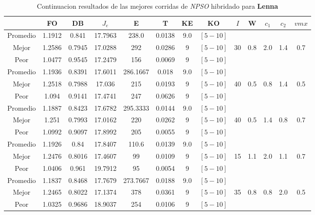 \begin{table}[h!]
    \footnotesize
    \begin{center}
        \begin{tabular}{|c|c|c|c|c|c|c|c|c|c|c|c|c|}
        \hline
            & {\bf FO} & {\bf DB} & $J_e$ & {\bf E} & {\bf T} & {\bf KE} & {\bf KO} & $I$ & W & $c_1$ & $c_2$ & $vmx$ \\
        \hline
        \hline
            Promedio  & 1.1912 & 0.841 & 17.7963 & 238.0 & 0.0138 & 9.0 & $[5-10]$ &  &  &  &  & \\
            \cline{1-8}
            Mejor & 1.2586 & 0.7945  & 17.0288 & 292 & 0.0286 & 9 & $[5-10]$ & 30 & 0.8 & 2.0 & 1.4 & 0.7\\
            \cline{1-8}
            Peor & 1.0477 & 0.9545  & 17.2479 & 156 & 0.0069 & 9 & $[5-10]$ &  &  &  &  & \\
        \hline
        \hline
            Promedio  & 1.1936 & 0.8391 & 17.6011 & 286.1667 & 0.018 & 9.0 & $[5-10]$ &  &  &  &  & \\
            \cline{1-8}
            Mejor & 1.2518 & 0.7988  & 17.036 & 215 & 0.0193 & 9 & $[5-10]$ & 40 & 0.5 & 0.8 & 1.4 & 0.5\\
            \cline{1-8}
            Peor & 1.094 & 0.9141  & 17.4741 & 247 & 0.0626 & 9 & $[5-10]$ &  &  &  &  & \\
        \hline
        \hline
            Promedio  & 1.1887 & 0.8423 & 17.6782 & 295.3333 & 0.0144 & 9.0 & $[5-10]$ &  &  &  &  & \\
            \cline{1-8}
            Mejor & 1.251 & 0.7993  & 17.0162 & 220 & 0.0262 & 9 & $[5-10]$ & 40 & 0.5 & 1.4 & 0.8 & 0.7\\
            \cline{1-8}
            Peor & 1.0992 & 0.9097  & 17.8992 & 205 & 0.0055 & 9 & $[5-10]$ &  &  &  &  & \\
        \hline
        \hline
            Promedio  & 1.1926 & 0.84 & 17.8407 & 110.6 & 0.0139 & 9.0 & $[5-10]$ &  &  &  &  & \\
            \cline{1-8}
            Mejor & 1.2476 & 0.8016  & 17.4607 & 99 & 0.0109 & 9 & $[5-10]$ & 15 & 1.1 & 2.0 & 1.1 & 0.7\\
            \cline{1-8}
            Peor & 1.0406 & 0.961  & 19.7912 & 95 & 0.0054 & 9 & $[5-10]$ &  &  &  &  & \\
        \hline
        \hline
            Promedio  & 1.1837 & 0.8468 & 17.7679 & 273.7667 & 0.0188 & 9.0 & $[5-10]$ &  &  &  &  & \\
            \cline{1-8}
            Mejor & 1.2465 & 0.8022  & 17.1374 & 378 & 0.0361 & 9 & $[5-10]$ & 35 & 0.8 & 0.8 & 2.0 & 0.5\\
            \cline{1-8}
            Peor & 1.0325 & 0.9686  & 18.9037 & 254 & 0.0106 & 9 & $[5-10]$ &  &  &  &  & \\
        \hline
        \end{tabular}
        \caption{Continuacion resultados de las mejores corridas de \emph{NPSO} hibridado para {\bf Lenna}}
        \label{tb:tablepsohibimgc}
    \end{center}
\end{table}
